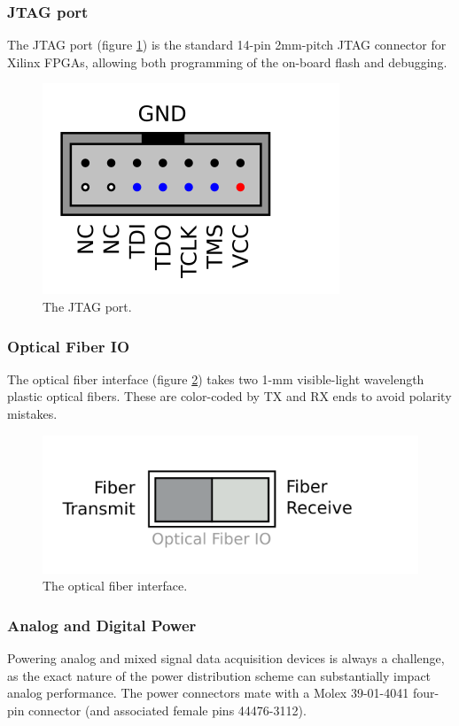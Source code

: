 \subsubsection{JTAG port}
The JTAG port (figure \ref{jtag}) is the standard 14-pin 2mm-pitch JTAG connector for
Xilinx FPGAs, allowing both programming of the on-board flash and
debugging.

\begin{figure}[h!]
\centering
\includegraphics[scale=1.0]{enclosure.back.jtag.svg}
\caption{The JTAG port.}
\label{jtag}
\end{figure}

\subsubsection{Optical Fiber IO}
The optical fiber interface (figure \ref{fiber}) takes two 1-mm
visible-light wavelength plastic optical fibers. These are color-coded
by TX and RX ends to avoid polarity mistakes.

\begin{figure}[h!]
\centering
\includegraphics[scale=1.0]{enclosure.back.fiber.svg}
\caption{The optical fiber interface.}
\label{fiber}
\end{figure}

\subsubsection{Analog and Digital Power}
Powering analog and mixed signal data acquisition devices is always a
challenge, as the exact nature of the power distribution scheme can
substantially impact analog performance. The power connectors mate
with a Molex 39-01-4041 four-pin connector (and associated female pins
44476-3112).  

